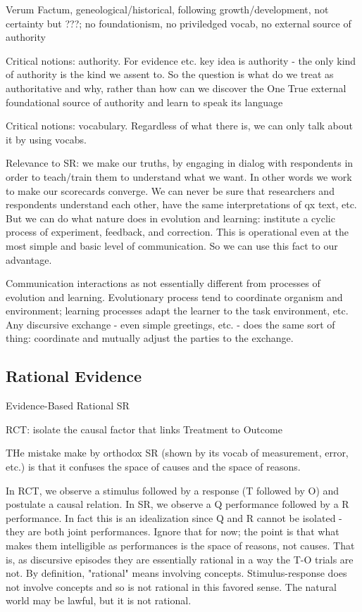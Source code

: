 \documentclass[11pt,twoside]{article}
\begin{document}
Verum Factum, geneological/historical, following growth/development,
not certainty but ???; no foundationism, no priviledged vocab, no
external source of authority

Critical notions: authority.  For evidence etc. key idea is authority - the only
kind of authority is the kind we assent to.  So the question is what
do we treat as authoritative and why, rather than how can we discover
the One True external foundational source of authority and learn to
speak its language

Critical notions: vocabulary.  Regardless of what there is, we can
only talk about it by using vocabs.

Relevance to SR: we make our truths, by engaging in dialog with
respondents in order to teach/train them to understand what we want.
In other words we work to make our scorecards converge.  We can never
be sure that researchers and respondents understand each other, have
the same interpretations of qx text, etc.  But we can do what nature
does in evolution and learning: institute a cyclic process of
experiment, feedback, and correction.  This is operational even at the
most simple and basic level of communication.  So we can use this fact
to our advantage.

Communication interactions as not essentially different from processes
of evolution and learning.  Evolutionary process tend to coordinate
organism and environment; learning processes adapt the learner to the
task environment, etc.  Any discursive exchange - even simple
greetings, etc. - does the same sort of thing: coordinate and mutually
adjust the parties to the exchange.

\subsection{Rational Evidence}

Evidence-Based Rational SR

RCT: isolate the causal factor that links Treatment to Outcome

THe mistake make by orthodox SR (shown by its vocab of measurement,
error, etc.) is that it confuses the space of causes and the space of
reasons.

In RCT, we observe a stimulus followed by a response (T followed by O)
and postulate a causal relation.  In SR, we observe a Q performance
followed by a R performance.  In fact this is an idealization since Q
and R cannot be isolated - they are both joint performances.  Ignore
that for now; the point is that what makes them intelligible as
performances is the space of reasons, not causes.  That is, as
discursive episodes they are essentially rational in a way the T-O
trials are not.  By definition, "rational" means involving concepts.
Stimulus-response does not involve concepts and so is not rational in
this favored sense.  The natural world may be lawful, but it is not
rational.
\end{document}
